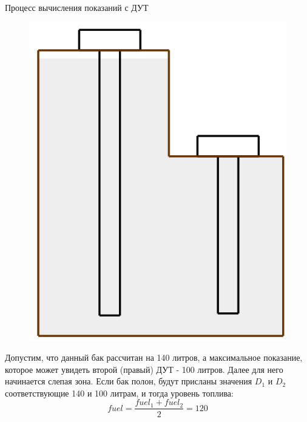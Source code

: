 \documentclass[usenames,dvipsnames,11pt]{beamer}
\begin{document}
\begin{frame}{Процесс вычисления показаний с ДУТ}
	\begin{minipage}[h]{0.39\linewidth}
		\begin{figure}
			\centering
			\includegraphics[width=0.9\linewidth]{graphics/screenshot004}
		\end{figure}
	\end{minipage}
	\hfill
	\begin{minipage}[h]{0.59\linewidth}
		Допустим, что данный бак рассчитан на 140 литров, а максимальное показание, которое может увидеть второй (правый) ДУТ - 100 литров. Далее для него начинается слепая зона.
		\bigbreak
		Если бак полон, будут присланы значения $D_1$ и $D_2$ соответствующие 140 и 100 литрам, и тогда уровень топлива:
		$$fuel = \frac{fuel_1 + fuel_2}{2} = 120$$	
	\end{minipage}
\end{frame}
\end{document}
